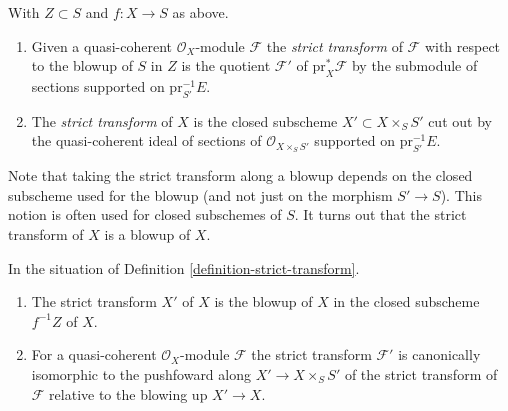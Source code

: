 \begin{definition}
\label{definition-strict-transform}
With $Z \subset S$ and $f : X \to S$ as above.
\begin{enumerate}
\item Given a quasi-coherent $\mathcal{O}_X$-module $\mathcal{F}$
the {\it strict transform} of $\mathcal{F}$ with respect to the blowup
of $S$ in $Z$ is the quotient $\mathcal{F}'$ of $\text{pr}_X^*\mathcal{F}$
by the submodule of sections supported on $\text{pr}_{S'}^{-1}E$.
\item The {\it strict transform} of $X$ is the closed subscheme
$X' \subset X \times_S S'$ cut out by the quasi-coherent ideal of
sections of $\mathcal{O}_{X \times_S S'}$ supported on $\text{pr}_{S'}^{-1}E$.
\end{enumerate}
\end{definition}

\noindent
Note that taking the strict transform along a blowup depends on the
closed subscheme used for the blowup
(and not just on the morphism $S' \to S$).
This notion is often used for closed subschemes of $S$.
It turns out that the strict transform of $X$ is a blowup of $X$.

\begin{lemma}
\label{lemma-strict-transform}
In the situation of Definition \ref{definition-strict-transform}.
\begin{enumerate}
\item The strict transform $X'$ of $X$ is the blowup of $X$ in the closed
subscheme $f^{-1}Z$ of $X$.
\item For a quasi-coherent $\mathcal{O}_X$-module $\mathcal{F}$ the
strict transform $\mathcal{F}'$ is canonically isomorphic to
the pushfoward along $X' \to X \times_S S'$ of the strict transform of
$\mathcal{F}$ relative to the blowing up $X' \to X$.
\end{enumerate}
\end{lemma}

